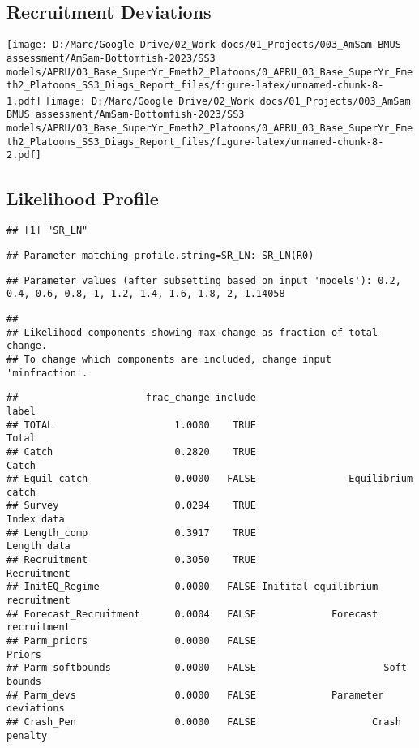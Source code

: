 \documentclass[
]{article}
\begin{document}
\hypertarget{recruitment-deviations}{%
\subsection{Recruitment Deviations}\label{recruitment-deviations}}

\texttt{[image: D:/Marc/Google Drive/02\_Work docs/01\_Projects/003\_AmSam BMUS assessment/AmSam-Bottomfish-2023/SS3 models/APRU/03\_Base\_SuperYr\_Fmeth2\_Platoons/0\_APRU\_03\_Base\_SuperYr\_Fmeth2\_Platoons\_SS3\_Diags\_Report\_files/figure-latex/unnamed-chunk-8-1.pdf]}
\texttt{[image: D:/Marc/Google Drive/02\_Work docs/01\_Projects/003\_AmSam BMUS assessment/AmSam-Bottomfish-2023/SS3 models/APRU/03\_Base\_SuperYr\_Fmeth2\_Platoons/0\_APRU\_03\_Base\_SuperYr\_Fmeth2\_Platoons\_SS3\_Diags\_Report\_files/figure-latex/unnamed-chunk-8-2.pdf]}

\hypertarget{likelihood-profile}{%
\subsection{Likelihood Profile}\label{likelihood-profile}}

\begin{verbatim}
## [1] "SR_LN"
\end{verbatim}

\begin{verbatim}
## Parameter matching profile.string=SR_LN: SR_LN(R0)
\end{verbatim}

\begin{verbatim}
## Parameter values (after subsetting based on input 'models'): 0.2, 0.4, 0.6, 0.8, 1, 1.2, 1.4, 1.6, 1.8, 2, 1.14058
\end{verbatim}

\begin{verbatim}
## 
## Likelihood components showing max change as fraction of total change.
## To change which components are included, change input 'minfraction'.
\end{verbatim}

\begin{verbatim}
##                      frac_change include                            label
## TOTAL                     1.0000    TRUE                            Total
## Catch                     0.2820    TRUE                            Catch
## Equil_catch               0.0000   FALSE                Equilibrium catch
## Survey                    0.0294    TRUE                       Index data
## Length_comp               0.3917    TRUE                      Length data
## Recruitment               0.3050    TRUE                      Recruitment
## InitEQ_Regime             0.0000   FALSE Initital equilibrium recruitment
## Forecast_Recruitment      0.0004   FALSE             Forecast recruitment
## Parm_priors               0.0000   FALSE                           Priors
## Parm_softbounds           0.0000   FALSE                      Soft bounds
## Parm_devs                 0.0000   FALSE             Parameter deviations
## Crash_Pen                 0.0000   FALSE                    Crash penalty
\end{verbatim}
\end{document}
